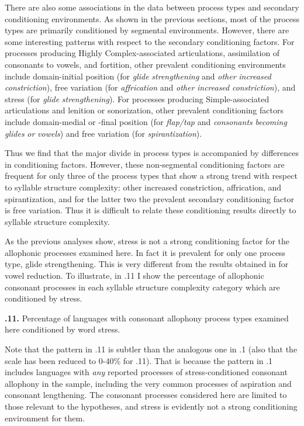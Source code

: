   There are also some associations in the data between process types and secondary conditioning environments. As shown in the previous sections, most of the process types are primarily conditioned by segmental environments. However, there are some interesting patterns with respect to the secondary conditioning factors. For processes producing Highly Complex-associated articulations, assimilation of consonants to vowels, and fortition, other prevalent conditioning environments include domain-initial position (for \textit{glide} \textit{strengthening} and \textit{other} \textit{increased} \textit{constriction}), free variation (for \textit{affrication} and \textit{other} \textit{increased} \textit{constriction}), and stress (for \textit{glide} \textit{strengthening}). For processes producing Simple-associated articulations and lenition or sonorization, other prevalent conditioning factors include domain-medial or -final position (for \textit{flap/tap} and \textit{consonants} \textit{becoming} \textit{glides} \textit{or} \textit{vowels}) and free variation (for \textit{spirantization}). 

  Thus we find that the major divide in process types is accompanied by differences in conditioning factors. However, these non-segmental conditioning factors are frequent for only three of the process types that show a strong trend with respect to syllable structure complexity: other increased constriction, affrication, and spirantization, and for the latter two the prevalent secondary conditioning factor is free variation. Thus it is difficult to relate these conditioning results directly to syllable structure complexity.

  As the previous analyses show, stress is not a strong conditioning factor for the allophonic processes examined here. In fact it is prevalent for only one process type, glide strengthening. This is very different from the results obtained in  for vowel reduction. To illustrate, in .11 I show the percentage of allophonic consonant processes in each syllable structure complexity category which are conditioned by stress.

\textbf{.11.} Percentage of languages with consonant allophony process types examined here conditioned by word stress.

  Note that the pattern in .11 is subtler than the analogous one in .1 (also that the scale has been reduced to 0-40\% for .11). That is because the pattern in .1 includes languages with \textit{any} reported processes of stress-conditioned consonant allophony in the sample, including the very common processes of aspiration and consonant lengthening. The consonant processes considered here are limited to those relevant to the hypotheses, and stress is evidently not a strong conditioning environment for them.


